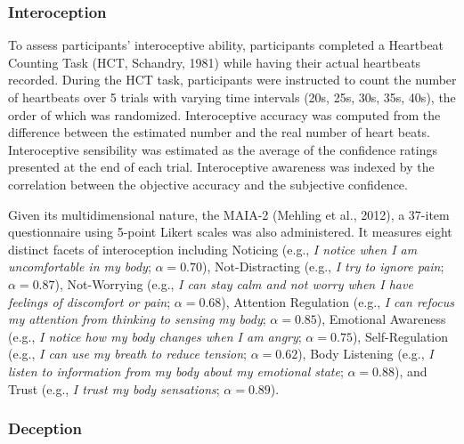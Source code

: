 \documentclass[
  man,mask,floatsintext]{apa6}
\begin{document}
\hypertarget{interoception}{%
\subsubsection{Interoception}\label{interoception}}

To assess participants' interoceptive ability, participants completed a Heartbeat Counting Task (HCT, Schandry, 1981) while having their actual heartbeats recorded. During the HCT task, participants were instructed to count the number of heartbeats over 5 trials with varying time intervals (20s, 25s, 30s, 35s, 40s), the order of which was randomized. Interoceptive accuracy was computed from the difference between the estimated number and the real number of heart beats. Interoceptive sensibility was estimated as the average of the confidence ratings presented at the end of each trial. Interoceptive awareness was indexed by the correlation between the objective accuracy and the subjective confidence.

Given its multidimensional nature, the MAIA-2 (Mehling et al., 2012), a 37-item questionnaire using 5-point Likert scales was also administered. It measures eight distinct facets of interoception including Noticing (e.g., \emph{I notice when I am uncomfortable in my body}; \(\alpha = 0.70\)), Not-Distracting (e.g., \emph{I try to ignore pain}; \(\alpha = 0.87\)), Not-Worrying (e.g., \emph{I can stay calm and not worry when I have feelings of discomfort or pain}; \(\alpha = 0.68\)), Attention Regulation (e.g., \emph{I can refocus my attention from thinking to sensing my body}; \(\alpha = 0.85\)), Emotional Awareness (e.g., \emph{I notice how my body changes when I am angry}; \(\alpha = 0.75\)), Self-Regulation (e.g., \emph{I can use my breath to reduce tension}; \(\alpha = 0.62\)), Body Listening (e.g., \emph{I listen to information from my body about my emotional state}; \(\alpha = 0.88\)), and Trust (e.g., \emph{I trust my body sensations}; \(\alpha = 0.89\)).

\hypertarget{deception}{%
\subsubsection{Deception}\label{deception}}
\end{document}
